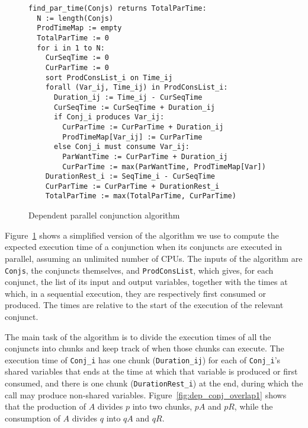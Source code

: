 \begin{figure}[tb]
\begin{center}
\begin{verbatim}
find_par_time(Conjs) returns TotalParTime:
  N := length(Conjs)
  ProdTimeMap := empty
  TotalParTime := 0
  for i in 1 to N:
    CurSeqTime := 0
    CurParTime := 0
    sort ProdConsList_i on Time_ij
    forall (Var_ij, Time_ij) in ProdConsList_i:
      Duration_ij := Time_ij - CurSeqTime
      CurSeqTime := CurSeqTime + Duration_ij
      if Conj_i produces Var_ij:
        CurParTime := CurParTime + Duration_ij
        ProdTimeMap[Var_ij] := CurParTime
      else Conj_i must consume Var_ij:
        ParWantTime := CurParTime + Duration_ij
        CurParTime := max(ParWantTime, ProdTimeMap[Var])
    DurationRest_i := SeqTime_i - CurSeqTime
    CurParTime := CurParTime + DurationRest_i
    TotalParTime := max(TotalParTime, CurParTime)
\end{verbatim}
\end{center}
\caption{Dependent parallel conjunction algorithm}
\label{fig:dep_par_conj_overlap_middle}
\end{figure}

Figure~\ref{fig:dep_par_conj_overlap_middle} shows
a simplified version of the algorithm we use to compute
the expected execution time of a conjunction
when its conjuncts are executed in parallel,
assuming an unlimited number of CPUs.
The inputs of the algorithm are \verb|Conjs|, the conjuncts themselves,
and \verb|ProdConsList|,
which gives, for each conjunct,
the list of its input and output variables,
together with the times at which,
in a sequential execution,
they are respectively first consumed or produced.
The times are relative to the start of the execution of the relevant conjunct.

The main task of the algorithm is
to divide the execution times of all the conjuncts into chunks
and keep track of when those chunks can execute.
The execution time of \verb|Conj_i|
has one chunk (\verb|Duration_ij|) for each of \verb|Conj_i|'s shared variables
that ends at the time at which that variable is produced or first consumed,
and there is one chunk (\verb|DurationRest_i|) at the end,
during which the call may produce non-shared variables.
Figure~\ref{fig:dep_conj_overlap1} shows that
the production of $A$ divides $p$ into two chunks, ${pA}$ and ${pR}$,
while the consumption of $A$ divides $q$ into ${qA}$ and ${qR}$.

